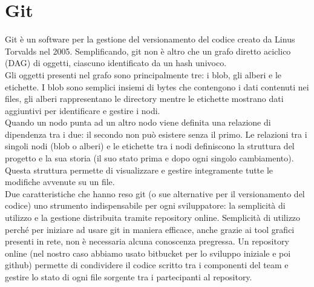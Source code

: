 \section{Git}
Git\cite{git-website} è un software per la gestione del versionamento del codice creato da Linus Torvalds nel 2005.
Semplificando, git non è altro che un grafo diretto aciclico (DAG) di oggetti,
ciascuno identificato da un hash univoco\cite{gitCS-website}.\\
Gli oggetti presenti nel grafo sono principalmente tre: i blob, gli alberi e le etichette.
I blob sono semplici insiemi di bytes che contengono i dati contenuti nei files,
gli alberi rappresentano le directory mentre le etichette mostrano dati aggiuntivi
per identificare e gestire i nodi.\\
Quando un nodo punta ad un altro nodo viene definita una relazione di dipendenza tra i due:
 il secondo non può esistere senza il primo.
Le relazioni tra i singoli nodi (blob o alberi) e le etichette tra i nodi definiscono
la struttura del progetto e la sua storia (il suo stato prima e dopo ogni singolo cambiamento).
Questa struttura permette di visualizzare e gestire integramente tutte le modifiche avvenute su un file.
\\[1\baselineskip]
Due caratteristiche che hanno reso git (o sue alternative per il versionamento del codice)
uno strumento indispensabile per ogni sviluppatore: la semplicità di utilizzo e
la gestione distribuita tramite repository online.
Semplicità di utilizzo perché per iniziare ad usare git in maniera
efficace, anche grazie ai tool grafici presenti in rete, non è necessaria
alcuna conoscenza pregressa.
Un repository online (nel nostro caso abbiamo usato bitbucket per lo sviluppo
iniziale e poi github) permette di condividere il codice scritto tra i componenti
del team e gestire lo stato di ogni file sorgente tra i partecipanti al repository.



